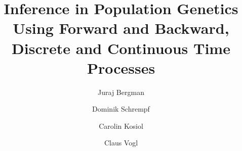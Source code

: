 \documentclass[preprint]{elsarticle}
\begin{document}
\begin{frontmatter}

\title{Inference in Population Genetics Using Forward and Backward, Discrete and Continuous Time Processes}

\author[address1,address2]{Juraj Bergman}
\author[address1,address2]{Dominik Schrempf}
\author[address1]{Carolin Kosiol}
\author[address3]{Claus Vogl}

\address[address1]{Institute of Population Genetics, Vetmeduni Vienna, Veterin\"arplatz 1, A-1210 Wien, Austria}
\address[address2]{Vienna Graduate School of Population Genetics, A-1210 Wien, Austria}
\address[address3]{Institute of Animal Breeding and Genetics, Veterin\"armedizinische Universit\"at Wien, Veterin\"arplatz 1, A-1210 Wien, Austria}

\begin{abstract}


\end{abstract}
\end{frontmatter}
\end{document}
